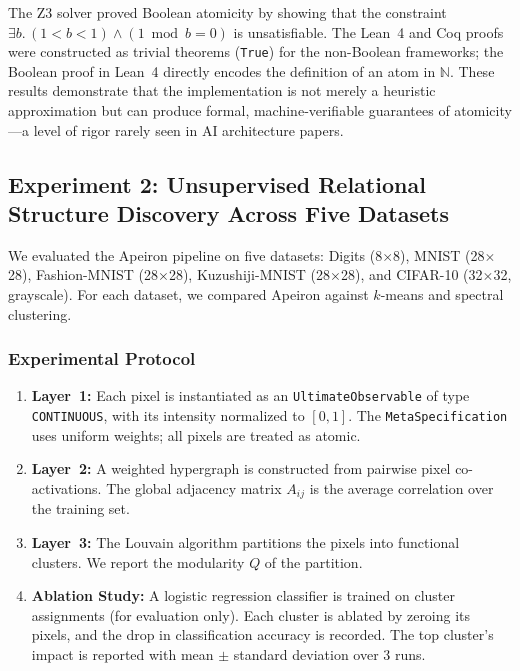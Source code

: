 The Z3 solver proved Boolean atomicity by showing that the constraint $\exists b.\, (1 < b < 1) \land (1 \bmod b = 0)$ is unsatisfiable. The Lean~4 and Coq proofs were constructed as trivial theorems (\texttt{True}) for the non-Boolean frameworks; the Boolean proof in Lean~4 directly encodes the definition of an atom in $\mathbb{N}$. These results demonstrate that the implementation is not merely a heuristic approximation but can produce formal, machine‑verifiable guarantees of atomicity---a level of rigor rarely seen in AI architecture papers.

\subsection{Experiment 2: Unsupervised Relational Structure Discovery Across Five Datasets}

We evaluated the Apeiron pipeline on five datasets: Digits (8$\times$8), MNIST (28$\times$28), Fashion-MNIST (28$\times$28), Kuzushiji-MNIST (28$\times$28), and CIFAR-10 (32$\times$32, grayscale). For each dataset, we compared Apeiron against $k$-means and spectral clustering.

\subsubsection{Experimental Protocol}

\begin{enumerate}
    \item \textbf{Layer~1:} Each pixel is instantiated as an \texttt{UltimateObservable} of type \texttt{CONTINUOUS}, with its intensity normalized to $[0,1]$. The \texttt{MetaSpecification} uses uniform weights; all pixels are treated as atomic.
    \item \textbf{Layer~2:} A weighted hypergraph is constructed from pairwise pixel co-activations. The global adjacency matrix $A_{ij}$ is the average correlation over the training set.
    \item \textbf{Layer~3:} The Louvain algorithm \cite{blondel2008fast} partitions the pixels into functional clusters. We report the modularity $Q$ of the partition.
    \item \textbf{Ablation Study:} A logistic regression classifier is trained on cluster assignments (for evaluation only). Each cluster is ablated by zeroing its pixels, and the drop in classification accuracy is recorded. The top cluster's impact is reported with mean $\pm$ standard deviation over 3 runs.
\end{enumerate}

